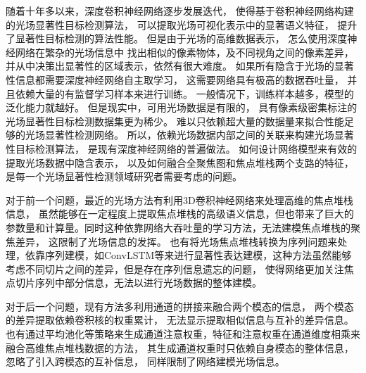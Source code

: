 




随着十年多以来，深度卷积神经网络逐步发展迭代，
使得基于卷积神经网络构建的光场显著性目标检测算法，
可以提取光场可视化表示中的显著语义特征，
提升了显著性目标检测的算法性能。
但是由于光场的高维数据表示，
怎么使用深度神经网络在繁杂的光场信息中
找出相似的像素物体，及不同视角之间的像素差异，
并从中决策出显著性的区域表示，依然有很大难度。
如果所有隐含于光场的显著性信息都需要深度神经网络自主取学习，
这需要网络具有极高的数据吞吐量，
并且依赖大量的有监督学习样本来进行训练。
一般情况下，训练样本越多，模型的泛化能力就越好。
但是现实中，可用光场数据是有限的，
具有像素级密集标注的光场显著性目标检测数据集更为稀少。
难以只依赖超大量的数据量来拟合性能足够的光场显著性检测网络。
所以，依赖光场数据内部之间的关联来构建光场显著性目标检测算法，
是现有深度神经网络的普遍做法。
如何设计网络模型来有效的提取光场数据中隐含表示，
以及如何融合全聚焦图和焦点堆栈两个支路的特征，
是每一个光场显著性检测领域研究者需要考虑的问题。






对于前一个问题，最近的光场方法有利用3D卷积神经网络来处理高维的焦点堆栈信息，
虽然能够在一定程度上提取焦点堆栈的高级语义信息，但也带来了巨大的参数量和计算量。同时这种依靠网络大吞吐量的学习方法，无法建模焦点堆栈的聚焦差异，
这限制了光场信息的发挥。
也有将光场焦点堆栈转换为序列问题来处理，依靠序列建模，如ConvLSTM等来进行显著性表达建模，这种方法虽然能够考虑不同切片之间的差异，但是存在序列信息遗忘的问题，
使得网络更加关注焦点切片序列中部分信息，无法以进行光场数据的整体建模。



对于后一个问题，现有方法多利用通道的拼接来融合两个模态的信息，
两个模态的差异提取依赖卷积核的权重累计，
无法显示提取相似信息与互补的差异信息。
也有通过平均池化等策略来生成通道注意权重，特征和注意权重在通道维度相乘来融合高维焦点堆栈数据的方法，
其生成通道权重时只依赖自身模态的整体信息，忽略了引入跨模态的互补信息，
同样限制了网络建模光场信息。







